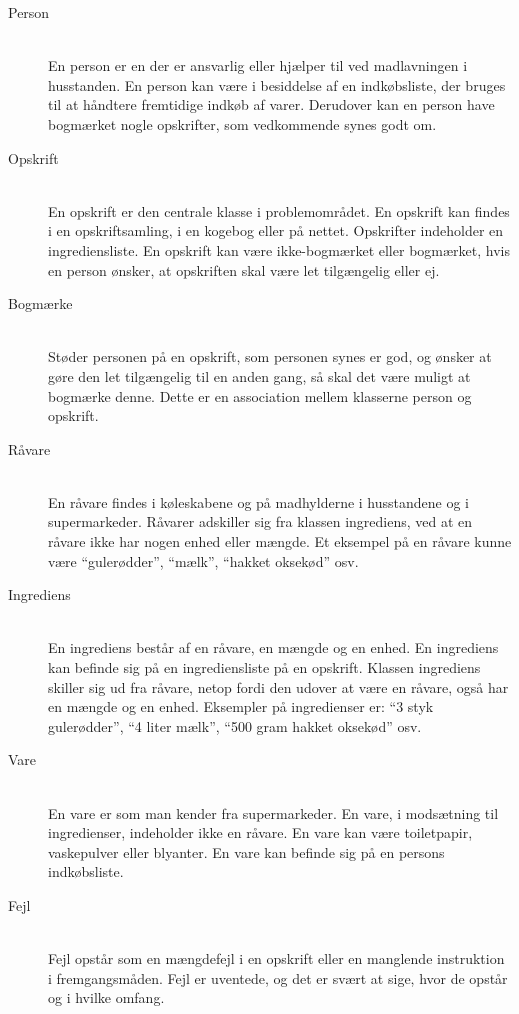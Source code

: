 \begin{description}
\item[Person] \hfill \\
En person er en der er ansvarlig eller hjælper til ved madlavningen i husstanden. En person kan være i besiddelse af en indkøbsliste, der bruges til at håndtere fremtidige indkøb af varer. Derudover kan en person have bogmærket nogle opskrifter, som vedkommende synes godt om.

\item[Opskrift] \hfill \\
En opskrift er den centrale klasse i problemområdet. En opskrift kan findes i en opskriftsamling, i en kogebog eller på nettet. Opskrifter indeholder en ingrediensliste. En opskrift kan være ikke-bogmærket eller bogmærket, hvis en person ønsker, at opskriften skal være let tilgængelig eller ej.

\item[Bogmærke] \hfill \\
Støder personen på en opskrift, som personen synes er god, og ønsker at gøre den let tilgængelig til en anden gang, så skal det være muligt at bogmærke denne. Dette er en association mellem klasserne person og opskrift.

\item[Råvare] \hfill \\
En råvare findes i køleskabene og på madhylderne i husstandene og i supermarkeder. Råvarer adskiller sig fra klassen ingrediens, ved at en råvare ikke har nogen enhed eller mængde. Et eksempel på en råvare kunne være ``gulerødder'', ``mælk'', ``hakket oksekød'' osv. 

\item[Ingrediens] \hfill \\ 
En ingrediens består af en råvare, en mængde og en enhed. En ingrediens kan befinde sig på en ingrediensliste på en opskrift. Klassen ingrediens skiller sig ud fra råvare, netop fordi den udover at være en råvare, også har en mængde og en enhed. Eksempler på ingredienser er: ``3 styk gulerødder'', ``4 liter mælk'', ``500 gram hakket oksekød'' osv.

\item[Vare] \hfill \\
En vare er som man kender fra supermarkeder. En vare, i modsætning til ingredienser, indeholder ikke en råvare. En vare kan \fx være toiletpapir, vaskepulver eller blyanter. En vare kan befinde sig på en persons indkøbsliste.

\item[Fejl] \hfill \\
Fejl opstår som \fx en mængdefejl i en opskrift eller en manglende instruktion i fremgangsmåden. Fejl er uventede, og det er svært at sige, hvor de opstår og i hvilke omfang.

\end{description}

